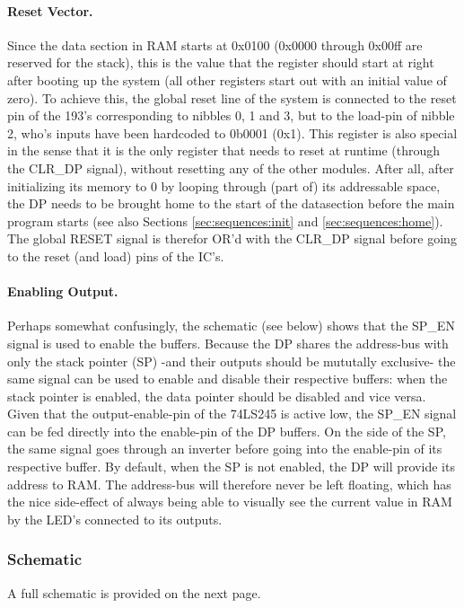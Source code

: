 \paragraph{Reset Vector.} Since the data section in RAM starts at 0x0100 (0x0000 through 0x00ff are reserved for the stack), this is the value that the register should start at right after booting up the system (all other registers start out with an initial value of zero). To achieve this, the global reset line of the system is connected to the reset pin of the 193's corresponding to nibbles 0, 1 and 3, but to the load-pin of nibble 2, who's inputs have been hardcoded to 0b0001 (0x1). This register is also special in the sense that it is the only register that needs to reset at runtime (through the CLR\_DP signal), without resetting any of the other modules. After all, after initializing its memory to 0 by looping through (part of) its addressable space, the DP needs to be brought home to the start of the datasection before the main program starts (see also Sections \ref{sec:sequences:init} and \ref{sec:sequences:home}). The global RESET signal is therefor OR'd with the CLR\_DP signal before going to the reset (and load) pins of the IC's.

\paragraph{Enabling Output.} Perhaps somewhat confusingly, the schematic (see below) shows that the SP\_EN signal is used to enable the buffers. Because the DP shares the address-bus with only the stack pointer (SP) -and their outputs should be mututally exclusive- the same signal can be used to enable and disable their respective buffers: when the stack pointer is enabled, the data pointer should be disabled and vice versa. Given that the output-enable-pin of the 74LS245 is active low, the SP\_EN signal can be fed directly into the enable-pin of the DP buffers. On the side of the SP, the same signal goes through an inverter before going into the enable-pin of its respective buffer. By default, when the SP is not enabled, the DP will provide its address to RAM. The address-bus will therefore never be left floating, which has the nice side-effect of always being able to visually see the current value in RAM by the LED's connected to its outputs. 

\subsubsection{Schematic}
A full schematic is provided on the next page.


